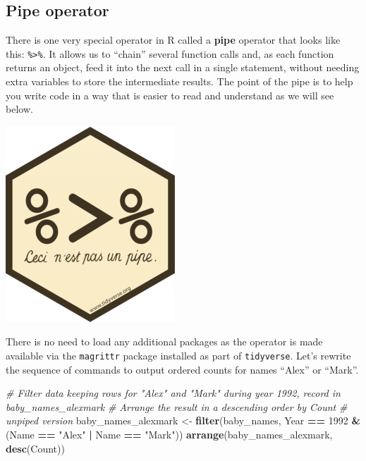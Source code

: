\documentclass[]{book}
\newenvironment{Shaded}{\begin{snugshade}}{\end{snugshade}}
\newcommand{\CommentTok}[1]{\textcolor[rgb]{0.56,0.35,0.01}{\textit{#1}}}
\newcommand{\DecValTok}[1]{\textcolor[rgb]{0.00,0.00,0.81}{#1}}
\newcommand{\KeywordTok}[1]{\textcolor[rgb]{0.13,0.29,0.53}{\textbf{#1}}}
\newcommand{\NormalTok}[1]{#1}
\newcommand{\OperatorTok}[1]{\textcolor[rgb]{0.81,0.36,0.00}{\textbf{#1}}}
\newcommand{\StringTok}[1]{\textcolor[rgb]{0.31,0.60,0.02}{#1}}
\begin{document}
\hypertarget{pipe-operator}{%
\subsection{Pipe operator}\label{pipe-operator}}

There is one very special operator in R called a \textbf{pipe} operator that
looks like this: \texttt{\%\textgreater{}\%}. It allows us to ``chain'' several function calls and,
as each function returns an object, feed it into the next call in a single
statement, without needing extra variables to store the intermediate
results. The point of the pipe is to help you write code in a way that is
easier to read and understand as we will see below.

\includegraphics{R/Rintro/images/magrittr.png}

There is no need to load any additional packages as the operator is made
available via the \texttt{magrittr} package installed as part of \texttt{tidyverse}. Let's
rewrite the sequence of commands to output ordered counts for names
``Alex'' or ``Mark''.

\begin{Shaded}
\begin{Highlighting}[]
\CommentTok{# Filter data keeping rows for "Alex" and "Mark" during year 1992, record in baby_names_alexmark}
\CommentTok{# Arrange the result in a descending order by Count}
\CommentTok{# unpiped version}
\NormalTok{baby_names_alexmark <-}\StringTok{ }\KeywordTok{filter}\NormalTok{(baby_names, Year }\OperatorTok{==}\StringTok{ }\DecValTok{1992} \OperatorTok{&}\StringTok{ }\NormalTok{(Name }\OperatorTok{==}\StringTok{ "Alex"} \OperatorTok{|}\StringTok{ }\NormalTok{Name }\OperatorTok{==}\StringTok{ "Mark"}\NormalTok{))}
\KeywordTok{arrange}\NormalTok{(baby_names_alexmark, }\KeywordTok{desc}\NormalTok{(Count))}
\end{Highlighting}
\end{Shaded}
\end{document}
